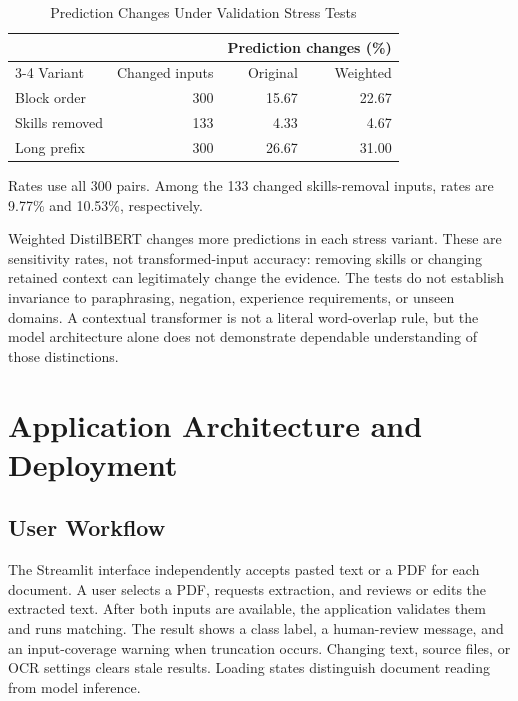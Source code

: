 \documentclass[conference,a4paper]{IEEEtran}
\begin{document}
\begin{table}[t]
\caption{Prediction Changes Under Validation Stress Tests}
\label{tab:robustness}
\centering\footnotesize
\setlength{\tabcolsep}{4pt}
\begin{tabular}{lrrr}
\toprule
 & & \multicolumn{2}{c}{Prediction changes (\%)}\\
\cmidrule(lr){3-4}
Variant & Changed inputs & Original & Weighted\\
\midrule
Block order & 300 & 15.67 & 22.67\\
Skills removed & 133 & 4.33 & 4.67\\
Long prefix & 300 & 26.67 & 31.00\\
\bottomrule
\end{tabular}
\vspace{2pt}
\parbox{\columnwidth}{\scriptsize Rates use all 300 pairs. Among the 133 changed skills-removal inputs, rates are 9.77\% and 10.53\%, respectively.}
\end{table}

Weighted DistilBERT changes more predictions in each stress variant. These are sensitivity rates, not transformed-input accuracy: removing skills or changing retained context can legitimately change the evidence. The tests do not establish invariance to paraphrasing, negation, experience requirements, or unseen domains. A contextual transformer is not a literal word-overlap rule, but the model architecture alone does not demonstrate dependable understanding of those distinctions.

\section{Application Architecture and Deployment}
\subsection{User Workflow}
The Streamlit interface independently accepts pasted text or a PDF for each document. A user selects a PDF, requests extraction, and reviews or edits the extracted text. After both inputs are available, the application validates them and runs matching. The result shows a class label, a human-review message, and an input-coverage warning when truncation occurs. Changing text, source files, or OCR settings clears stale results. Loading states distinguish document reading from model inference.
\end{document}

